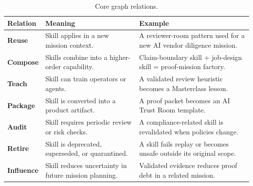 \documentclass[10.5pt]{article}
\theoremstyle{goThm}
\begin{document}
\begin{table}[H]
\centering
\caption{Core graph relations.}
\label{tab:edges}
\begin{tabularx}{\textwidth}{>{\bfseries\color{goNavy}}p{}p{}X}
\toprule
Relation & Meaning & Example \\
\midrule
Reuse & Skill applies in a new mission context. & A reviewer-room pattern used for a new AI vendor diligence mission. \\
Compose & Skills combine into a higher-order capability. & Claim-boundary skill + job-design skill = proof-mission factory. \\
Teach & Skill can train operators or agents. & A validated review heuristic becomes a Masterclass lesson. \\
Package & Skill is converted into a product artifact. & A proof packet becomes an AI Trust Room template. \\
Audit & Skill requires periodic review or risk checks. & A compliance-related skill is revalidated when policies change. \\
Retire & Skill is deprecated, superseded, or quarantined. & A skill fails replay or becomes unsafe outside its original scope. \\
Influence & Skill reduces uncertainty in future mission planning. & Validated evidence reduces proof debt in a related mission. \\
\bottomrule
\end{tabularx}
\end{table}
\end{document}
